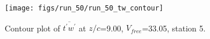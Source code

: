 \begin{figure}[H]
\centering
\texttt{[image: figs/run\_50/run\_50\_tw\_contour]}
\caption{Contour plot of $\overline{t^\prime w^\prime}$ at $z/c$=9.00, $V_{free}$=33.05, station 5.}
\end{figure}


